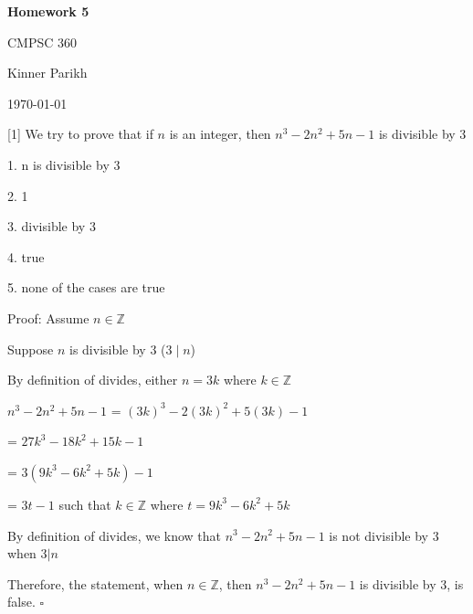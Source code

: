 \documentclass{article} %
\newcommand{\question}[2][]{\begin{flushleft}
        \textbf{Question #1}: #2
\end{flushleft}}
\newcommand{\maketitletwo}[2][]{\begin{center}
        \Large{\textbf{Homework #1}
            
            CMPSC 360} %
        \vspace{5pt}
        
        \normalsize{Kinner Parikh  %
        
        \today}        %
        \vspace{15pt}
        
\end{center}}
\begin{document}
    \maketitletwo[5]  %

                                                               
    
    \question[1]{ We try to prove that if $n$ is an integer, then $n^3-2n^2+5n-1$ is divisible by 3}

    1. n is divisible by 3

    2. 1

    3. divisible by 3

    4. true

    5. none of the cases are true


    Proof: Assume $n \in \mathbb{Z}$

    Suppose $n$ is divisible by 3 ($3 \mid n$)

    By definition of divides, either $n = 3k$ where $k \in \mathbb{Z}$

    $n^3-2n^2+5n-1$ = $(3k)^3 - 2(3k)^2 + 5(3k) - 1$

    \tabto*{3.4cm} = $27k^3 - 18k^2 + 15k - 1$

    \tabto*{3.4cm} = $3(9k^3 - 6k^2 + 5k) - 1$

    \tabto*{3.4cm} = $3t - 1$ such that $k \in \mathbb{Z}$ where $t = 9k^3 - 6k^2 + 5k$

    By definition of divides, we know that $n^3-2n^2+5n-1$ is not divisible by 3 when $3 | n$

    Therefore, the statement, when $n \in \mathbb{Z}$, then $n^3-2n^2+5n-1$ is divisible by 3, is false. $\square$






\end{document}

